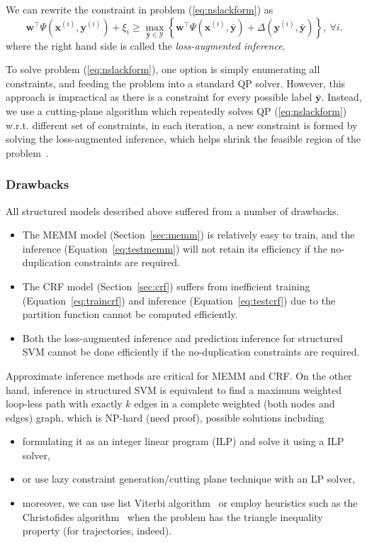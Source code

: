 \documentclass[9pt]{extarticle}
\begin{document}
We can rewrite the constraint in problem (\ref{eq:nslackform}) as
\begin{equation}
\label{eq:ssvminf}
\mathbf{w}^\top \Psi(\mathbf{x}^{(i)}, \mathbf{y}^{(i)}) + \xi_i \ge
          \max_{\bar{\mathbf{y}} \in \mathcal{Y}} 
          \left\{\mathbf{w}^\top \Psi(\mathbf{x}^{(i)}, \bar{\mathbf{y}}) + \Delta(\mathbf{y}^{(i)}, \bar{\mathbf{y}}) \right\},~ \forall i.
\end{equation}
where the right hand side is called the \emph{loss-augmented inference}.

To solve problem (\ref{eq:nslackform}), one option is simply enumerating all constraints, and feeding the problem into a standard QP solver.
However, this approach is impractical as there is a constraint for every possible label $\bar{\mathbf{y}}$.
Instead, we use a cutting-plane algorithm which repeatedly solves QP (\ref{eq:nslackform}) w.r.t. different set of constraints, 
in each iteration, a new constraint is formed by solving the loss-augmented inference, 
which helps shrink the feasible region of the problem~\cite{joachims2009predicting}.



\subsubsection{Drawbacks}

All structured models described above suffered from a number of drawbacks.
\begin{itemize}
\item The MEMM model (Section~\ref{sec:memm}) is relatively easy to train, 
      and the inference (Equation~\ref{eq:testmemm}) will not retain its efficiency if the no-duplication constraints are required.
\item The CRF model (Section~\ref{sec:crf}) suffers from inefficient training (Equation~\ref{eq:traincrf}) and 
      inference (Equation~\ref{eq:testcrf}) due to the partition function cannot be computed efficiently.
\item Both the loss-augmented inference and prediction inference for structured SVM cannot be done efficiently 
      if the no-duplication constraints are required.
\end{itemize}

Approximate inference methods are critical for MEMM and CRF.
On the other hand, inference in structured SVM is equivalent to 
find a maximum weighted loop-less path with exactly $k$ edges in a complete weighted (both nodes and edges) graph, which is NP-hard (need proof),
possible solutions including 
\begin{itemize}
\item formulating it as an integer linear program (ILP) and solve it using a ILP solver,
\item or use lazy constraint generation/cutting plane technique with an LP solver,
\item moreover, we can use list Viterbi algorithm~\cite{nill1995list} or employ heuristics such as the Christofides algorithm~\cite{christofides1976} 
      when the problem has the triangle inequality property (for trajectories, indeed).
\end{itemize}
\end{document}
